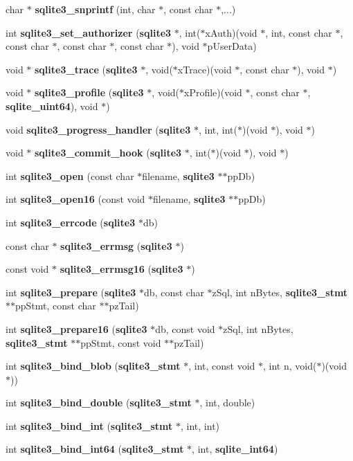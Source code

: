 \begin{DoxyCompactItemize}
char $\ast$ {\bf sqlite3\_\-snprintf} (int, char $\ast$, const char $\ast$,...)
\item 
int {\bf sqlite3\_\-set\_\-authorizer} ({\bf sqlite3} $\ast$, int($\ast$xAuth)(void $\ast$, int, const char $\ast$, const char $\ast$, const char $\ast$, const char $\ast$), void $\ast$pUserData)
\item 
void $\ast$ {\bf sqlite3\_\-trace} ({\bf sqlite3} $\ast$, void($\ast$xTrace)(void $\ast$, const char $\ast$), void $\ast$)
\item 
void $\ast$ {\bf sqlite3\_\-profile} ({\bf sqlite3} $\ast$, void($\ast$xProfile)(void $\ast$, const char $\ast$, {\bf sqlite\_\-uint64}), void $\ast$)
\item 
void {\bf sqlite3\_\-progress\_\-handler} ({\bf sqlite3} $\ast$, int, int($\ast$)(void $\ast$), void $\ast$)
\item 
void $\ast$ {\bf sqlite3\_\-commit\_\-hook} ({\bf sqlite3} $\ast$, int($\ast$)(void $\ast$), void $\ast$)
\item 
int {\bf sqlite3\_\-open} (const char $\ast$filename, {\bf sqlite3} $\ast$$\ast$ppDb)
\item 
int {\bf sqlite3\_\-open16} (const void $\ast$filename, {\bf sqlite3} $\ast$$\ast$ppDb)
\item 
int {\bf sqlite3\_\-errcode} ({\bf sqlite3} $\ast$db)
\item 
const char $\ast$ {\bf sqlite3\_\-errmsg} ({\bf sqlite3} $\ast$)
\item 
const void $\ast$ {\bf sqlite3\_\-errmsg16} ({\bf sqlite3} $\ast$)
\item 
int {\bf sqlite3\_\-prepare} ({\bf sqlite3} $\ast$db, const char $\ast$zSql, int nBytes, {\bf sqlite3\_\-stmt} $\ast$$\ast$ppStmt, const char $\ast$$\ast$pzTail)
\item 
int {\bf sqlite3\_\-prepare16} ({\bf sqlite3} $\ast$db, const void $\ast$zSql, int nBytes, {\bf sqlite3\_\-stmt} $\ast$$\ast$ppStmt, const void $\ast$$\ast$pzTail)
\item 
int {\bf sqlite3\_\-bind\_\-blob} ({\bf sqlite3\_\-stmt} $\ast$, int, const void $\ast$, int n, void($\ast$)(void $\ast$))
\item 
int {\bf sqlite3\_\-bind\_\-double} ({\bf sqlite3\_\-stmt} $\ast$, int, double)
\item 
int {\bf sqlite3\_\-bind\_\-int} ({\bf sqlite3\_\-stmt} $\ast$, int, int)
\item 
int {\bf sqlite3\_\-bind\_\-int64} ({\bf sqlite3\_\-stmt} $\ast$, int, {\bf sqlite\_\-int64})
\item 

\end{DoxyCompactItemize}
